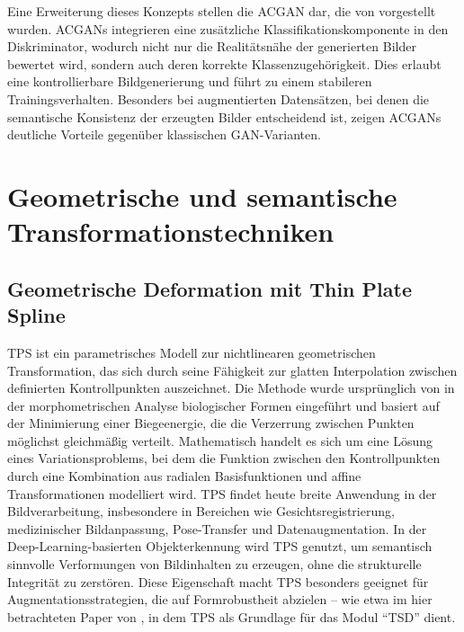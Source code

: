 Eine Erweiterung dieses Konzepts stellen die \ac{ACGAN} dar, die von \textcite{odena2017ACGAN} vorgestellt wurden. \ac{ACGAN}s integrieren eine zusätzliche Klassifikationskomponente in den Diskriminator, wodurch nicht nur die Realitätsnähe der generierten Bilder bewertet wird, sondern auch deren korrekte Klassenzugehörigkeit. Dies erlaubt eine kontrollierbare Bildgenerierung und führt zu einem stabileren Trainingsverhalten. Besonders bei augmentierten Datensätzen, bei denen die semantische Konsistenz der erzeugten Bilder entscheidend ist, zeigen \ac{ACGAN}s deutliche Vorteile gegenüber klassischen \ac{GAN}-Varianten.





\section{Geometrische und semantische Transformationstechniken}
\label{sec:GeometrischeTransformationstechniken}




\subsection{Geometrische Deformation mit Thin Plate Spline}
\acl{TPS} ist ein parametrisches Modell zur nichtlinearen geometrischen Transformation, das sich durch seine Fähigkeit zur glatten Interpolation zwischen definierten Kontrollpunkten auszeichnet. Die Methode wurde ursprünglich von \textcite{bookstein1993thin} in der morphometrischen Analyse biologischer Formen eingeführt und basiert auf der Minimierung einer Biegeenergie, die die Verzerrung zwischen Punkten möglichst gleichmäßig verteilt. Mathematisch handelt es sich um eine Lösung eines Variationsproblems, bei dem die Funktion zwischen den Kontrollpunkten durch eine Kombination aus radialen Basisfunktionen und affine Transformationen modelliert wird.
\ac{TPS} findet heute breite Anwendung in der Bildverarbeitung, insbesondere in Bereichen wie Gesichtsregistrierung, medizinischer Bildanpassung, Pose-Transfer und Datenaugmentation. In der Deep-Learning-basierten Objekterkennung wird \ac{TPS} genutzt, um semantisch sinnvolle Verformungen von Bildinhalten zu erzeugen, ohne die strukturelle Integrität zu zerstören. Diese Eigenschaft macht \ac{TPS} besonders geeignet für Augmentationsstrategien, die auf Formrobustheit abzielen – wie etwa im hier betrachteten Paper von \textcite{He_2023_ICCV}, in dem \ac{TPS} als Grundlage für das Modul \enquote{\acf{TSD}} dient.




